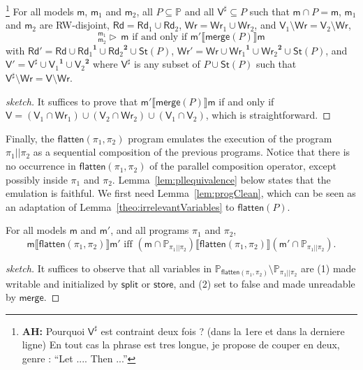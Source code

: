 \documentclass{llncs}
\newcommand{\progStore}{\mathsf{store}}
\newcommand{\progsplit}{\mathsf{split}}
\newcommand{\progmerge}{\mathsf{merge}}
\newcommand{\progFlatten}{\mathsf{flatten}}
\newcommand{\cp}[2]{{#2}^\mathbf{#1}}
\newcommand{\modl}{\mathsf m}
\newcommand{\mrg}[3]{ ^{#2}_{#3} \triangleright \, #1 }
\newcommand{\pll}{ {||} }							%
\newcommand{\readset}{\mathsf{Rd}}
\newcommand{\valuset}{\mathsf{V}}
\newcommand{\writeset}{\mathsf{Wr}}
\newcommand{\storeset}{\mathsf{St}}
\newcommand{\ah}[1]{\footnote{\textbf{AH:} #1}}
\newcommand{\intPgm}[1]{\llbracket #1 \rrbracket}
\newcommand{\propset}{\mathbb P}
\newcommand{\propsetOf}[1]{\propset_{#1}}
\newcommand{\modinter}{\cap}
\begin{document}
\begin{lemma}\label{lem:progmerge}
\ah{
Pourquoi $\valuset^\sharp $ est contraint deux fois ? (dans la 1ere et dans la derniere ligne)
En tout cas la phrase est tres longue, je propose de couper en deux, genre : ``Let .... Then ...''
}
For all models $\modl$, $\modl_1$ and $\modl_2$, all $P \subseteq \propset$ and all $\valuset^\sharp \subseteq P$
such that $\modl \modinter P = \modl$,
        $\modl_1$ and $\modl_2$ are RW-disjoint,
        $\readset = \readset_1 \cup \readset_2$,
        $\writeset = \writeset_1 \cup \writeset_2$, and
        $\valuset_1 \setminus \writeset = \valuset_2 \setminus \writeset$,
$$\mrg \modl {\modl_1} {\modl_2} \text{ if and only if }
\modl' \intPgm{\progmerge(P)} \modl$$ with
$\readset' = \readset \cup \cp 1 {\readset_1} \cup \cp 2 {\readset_2} \cup \storeset(P)$,
$\writeset' = \writeset \cup \cp 1 {\writeset_1} \cup \cp 2 {\writeset_2} \cup \storeset(P)$, and
$\valuset' = \valuset^\sharp \cup \cp 1 {\valuset_1} \cup \cp 2 {\valuset_2}$
where $\valuset^\sharp$ is any subset of $P \cup \storeset(P)$ such that
$\valuset^\sharp \setminus \writeset = \valuset \setminus \writeset$.
\end{lemma}
\begin{proof}[sketch]
It suffices to prove that
$\modl' \intPgm{\progmerge(P)} \modl$ if and only if
$\valuset = (\valuset_1 \cap \writeset_1) \cup (\valuset_2 \cap \writeset_2) \cup (\valuset_1 \cap \valuset_2) $,
which is straightforward.
\end{proof}

Finally, the $\progFlatten(\pi_1, \pi_2)$ program emulates the execution of the program $\pi_1 \pll \pi_2$ as
a sequential composition of the previous programs.
Notice that there is no occurrence in $\progFlatten(\pi_1, \pi_2)$ of the parallel composition operator,
except possibly inside $\pi_1$ and $\pi_2$.
Lemma~\ref{lem:pllequivalence} below states that the emulation is faithful.
We first need Lemma~\ref{lem:progClean},
which can be seen as an adaptation of Lemma~\ref{theo:irrelevantVariables} to $\progFlatten(P)$.

\begin{lemma}\label{lem:progClean}
For all models $\modl$ and $\modl'$, and all programs $\pi_1$ and $\pi_2$,
$$
\modl \intPgm{\progFlatten(\pi_1,\pi_2)} \modl' \text{ iff }
(\modl \modinter \propsetOf{\pi_1 \pll \pi_2}) \intPgm{\progFlatten(\pi_1, \pi_2)} (\modl' \modinter \propsetOf{\pi_1 \pll \pi_2}).
$$
\end{lemma}
\begin{proof}[sketch]
It suffices to observe that all variables in $\propsetOf{\progFlatten(\pi_1, \pi_2)} \setminus \propsetOf{\pi_1 \pll \pi_2}$ are 
(1) made writable and initialized by $\progsplit$ or $\progStore$, and 
(2) set to false and made unreadable by $\progmerge$.
\end{proof}
\end{document}
